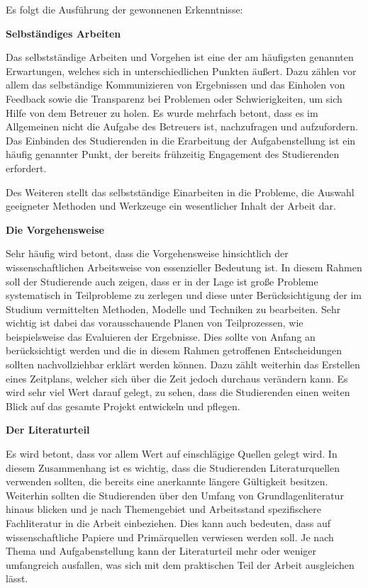 \documentclass[bibliography=totoc,listof=totoc,BCOR=5mm,DIV=12,oneside]{scrbook}
\begin{document}
\par\medskip Es folgt die Ausführung der gewonnenen Erkenntnisse:

\par \bigskip \textbf{Selbständiges Arbeiten}
\par Das selbstständige Arbeiten und Vorgehen ist eine der am häufigsten genannten Erwartungen, welches sich in unterschiedlichen Punkten äußert. Dazu zählen vor allem das selbständige Kommunizieren von Ergebnissen und das Einholen von Feedback sowie die Transparenz bei Problemen oder Schwierigkeiten, um sich Hilfe von dem Betreuer zu holen. Es wurde mehrfach betont, dass es im Allgemeinen nicht die Aufgabe des Betreuers ist, nachzufragen und aufzufordern. Das Einbinden des Studierenden in die Erarbeitung der Aufgabenstellung ist ein häufig genannter Punkt, der bereits frühzeitig Engagement des Studierenden erfordert.
\par Des Weiteren stellt das selbstständige Einarbeiten in die Probleme, die Auswahl geeigneter Methoden und Werkzeuge ein wesentlicher Inhalt der Arbeit dar.
\par \bigskip \textbf{Die Vorgehensweise}
\par Sehr häufig wird betont, dass die Vorgehensweise hinsichtlich der wissenschaftlichen Arbeitsweise von essenzieller Bedeutung ist. In diesem Rahmen soll der Studierende auch zeigen, dass er in der Lage ist große Probleme systematisch in Teilprobleme zu zerlegen und diese unter Berücksichtigung der im Studium vermittelten Methoden, Modelle und Techniken zu bearbeiten. Sehr wichtig ist dabei das vorausschauende Planen von Teilprozessen, wie beispielsweise das Evaluieren der Ergebnisse. Dies sollte von Anfang an berücksichtigt werden und die in diesem Rahmen getroffenen Entscheidungen sollten nachvollziehbar erklärt werden können. Dazu zählt weiterhin das Erstellen eines Zeitplans, welcher sich über die Zeit jedoch durchaus verändern kann. Es wird sehr viel Wert darauf gelegt, zu sehen, dass die Studierenden einen weiten Blick auf das gesamte Projekt entwickeln und pflegen.
\par \bigskip \textbf{Der Literaturteil}
\par Es wird betont, dass vor allem Wert auf einschlägige Quellen gelegt wird. In diesem Zusammenhang ist es wichtig, dass die Studierenden Literaturquellen verwenden sollten, die bereits eine anerkannte längere Gültigkeit besitzen. Weiterhin sollten die Studierenden über den Umfang von Grundlagenliteratur hinaus blicken und je nach Themengebiet und Arbeitsstand spezifischere Fachliteratur in die Arbeit einbeziehen. Dies kann auch bedeuten, dass auf wissenschaftliche Papiere und Primärquellen verwiesen werden soll. Je nach Thema und Aufgabenstellung kann der Literaturteil mehr oder weniger umfangreich ausfallen, was sich mit dem praktischen Teil der Arbeit ausgleichen lässt.
\end{document}
